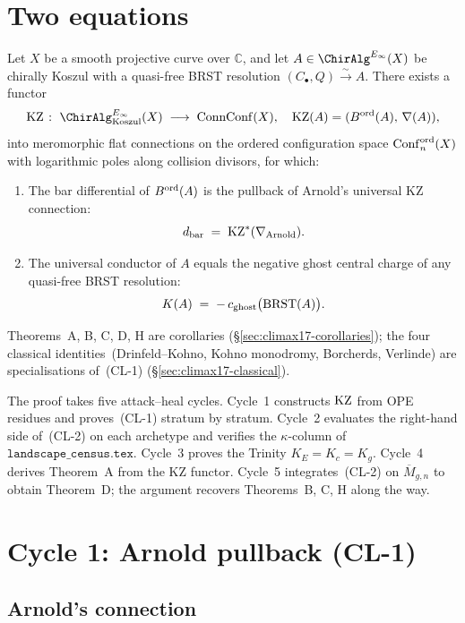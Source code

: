 \section{Two equations}
\label{sec:climax17-two}

\begin{theorem}[Climax]
\label{thm:climax17-two}
\ClaimStatusProvedHere
Let $X$ be a smooth projective curve over $\mathbb{C}$, and let
$A\in\ChirAlg^{E_\infty}(X)$ be chirally Koszul with a quasi-free BRST
resolution $(C_\bullet,Q)\xrightarrow{\sim}A$. There exists a functor
\[
  \KZ\;\colon\;\ChirAlg^{E_\infty}_{\mathrm{Koszul}}(X)
    \;\longrightarrow\;\mathrm{ConnConf}(X),
  \quad
  \KZ(A)=(\Bord(A),\,\nabla(A)),
\]
into meromorphic flat connections on the ordered configuration space
$\operatorname{Conf}_n^{\mathrm{ord}}(X)$ with logarithmic poles along collision
divisors, for which:
\begin{enumerate}
\item[\textup{(CL-1)}] The bar differential of $B^{\mathrm{ord}}(A)$ is the
      pullback of Arnold's universal KZ connection:
      \[
        d_{\mathrm{bar}}\;=\;\mathrm{KZ}^{*}(\nabla_{\mathrm{Arnold}}).
      \]
\item[\textup{(CL-2)}] The universal conductor of $A$ equals the
      negative ghost central charge of any quasi-free BRST resolution:
      \[
        K(A)\;=\;-\,c_{\mathrm{ghost}}\bigl(\mathrm{BRST}(A)\bigr).
      \]
\end{enumerate}
Theorems~\textup{A, B, C, D, H} are corollaries
(\S\ref{sec:climax17-corollaries}); the four classical
identities~\textup{(Drinfeld--Kohno, Kohno monodromy, Borcherds,
Verlinde)} are specialisations of~\textup{(CL-1)}
(\S\ref{sec:climax17-classical}).
\end{theorem}

The proof takes five attack--heal cycles. Cycle~1 constructs $\mathrm{KZ}$ from
OPE residues and proves~\textup{(CL-1)} stratum by stratum. Cycle~2
evaluates the right-hand side of~\textup{(CL-2)} on each archetype and
verifies the $\kappa$-column of $\texttt{landscape\_census.tex}$.
Cycle~3 proves the Trinity $K_E=K_c=K_g$. Cycle~4 derives Theorem~A
from the KZ functor. Cycle~5 integrates~\textup{(CL-2)} on
$\overline{M}_{g,n}$ to obtain Theorem~D; the argument recovers
Theorems~B, C, H along the way.

\section{Cycle 1: Arnold pullback (CL-1)}
\label{sec:climax17-cycle1}

\subsection{Arnold's connection}

